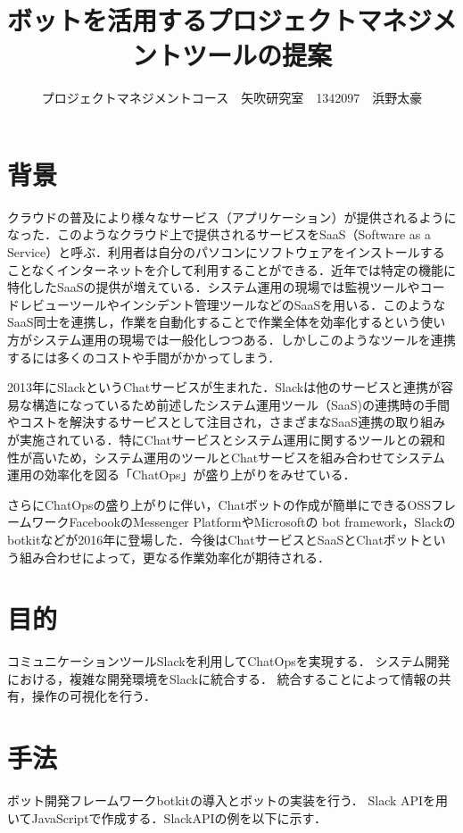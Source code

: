 \documentclass[uplatex,twocolumn,dvipdfmx]{jsarticle}
\title{\vspace{-5mm}\fontsize{14pt}{0pt}\selectfont ボットを活用するプロジェクトマネジメントツールの提案}
\author{\normalsize プロジェクトマネジメントコース　矢吹研究室　1342097　浜野太豪}
\date{}
\begin{document}
\fontsize{10.5pt}{\baselineskip}\selectfont
\maketitle





\section{背景}
クラウドの普及により様々なサービス（アプリケーション）が提供されるようになった．このようなクラウド上で提供されるサービスをSaaS（Software as a Service）と呼ぶ．利用者は自分のパソコンにソフトウェアをインストールすることなくインターネットを介して利用することができる\cite{saas}．近年では特定の機能に特化したSaaSの提供が増えている．システム運用の現場では監視ツールやコードレビューツールやインシデント管理ツールなどのSaaSを用いる．このようなSaaS同士を連携し，作業を自動化することで作業全体を効率化するという使い方がシステム運用の現場では一般化しつつある．しかしこのようなツールを連携するには多くのコストや手間がかかってしまう．

2013年にSlackというChatサービスが生まれた．Slackは他のサービスと連携が容易な構造になっているため\cite{slack}前述したシステム運用ツール（SaaS)の連携時の手間やコストを解決するサービスとして注目され，さまざまなSaaS連携の取り組みが実施されている．特にChatサービスとシステム運用に関するツールとの親和性が高いため，システム運用のツールとChatサービスを組み合わせてシステム運用の効率化を図る「ChatOps」が盛り上がりをみせている．

さらにChatOpsの盛り上がりに伴い，Chatボットの作成が簡単にできるOSSフレームワークFacebookのMessenger PlatformやMicrosoftの bot framework，Slackのbotkitなどが2016年に登場した．今後はChatサービスとSaaSとChatボットという組み合わせによって，更なる作業効率化が期待される．






\section{目的}
コミュニケーションツールSlackを利用してChatOpsを実現する．
システム開発における，複雑な開発環境をSlackに統合する．
統合することによって情報の共有，操作の可視化を行う．



\section{手法}
ボット開発フレームワークbotkitの導入とボットの実装を行う．
Slack APIを用いてJavaScriptで作成する．SlackAPIの例を以下に示す．
\end{document}
